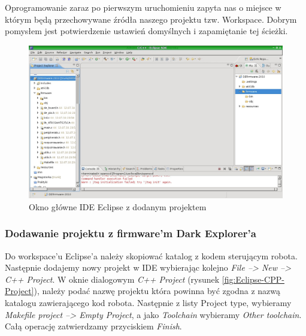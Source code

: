 Oprogramowanie zaraz po pierwszym uruchomieniu zapyta nas o miejsce w którym będą
przechowywane źródła naszego projektu tzw. Workspace. Dobrym pomysłem jest
potwierdzenie ustawień domyślnych i zapamiętanie tej ścieżki.

\begin{figure}[h!]
 \centering
 \includegraphics[width=150.0mm]{../images/ch03/Eclipse-MainWindow.jpg}
 \caption{Okno główne IDE Eclipse z dodanym projektem}
 \label{fig:Eclipse-MainWindow}
\end{figure}

\subsubsection{Dodawanie projektu z firmware'm Dark Explorer'a}
Do workspace'u Eclipse'a należy skopiować katalog z kodem sterującym robota.
Następnie dodajemy nowy projekt w IDE wybierając kolejno \textit{File --> New -->
C++ Project}. W oknie dialogowym \textit{C++ Project} (rysunek
\ref{fig:Eclipse-CPP-Project}), należy podać nazwę projektu która powinna być
zgodna z nazwą katalogu zawierającego kod robota. Następnie z listy Project type,
wybieramy \textit{Makefile project --> Empty Project}, a jako \textit{Toolchain}
wybieramy \textit{Other toolchain}. Całą operację zatwierdzamy przyciskiem
\textit{Finish}.

